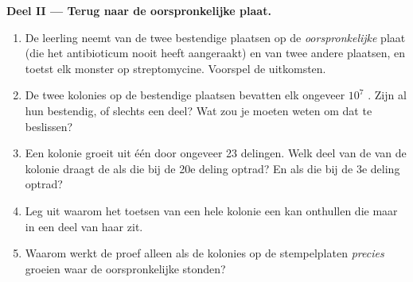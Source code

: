 \begin{problem}
\medskip
\noindent\textbf{Deel II --- Terug naar de oorspronkelijke plaat.}
\begin{enumerate}[resume]
  \item De leerling neemt  van de twee bestendige plaatsen op de
        \emph{oorspronkelijke} plaat (die het antibioticum nooit heeft
        aangeraakt) en van twee andere plaatsen, en toetst elk monster op
        streptomycine. Voorspel de uitkomsten.
  \item De twee kolonies op de bestendige plaatsen bevatten elk ongeveer
        $10^7$ . Zijn al hun  bestendig, of slechts een deel?
        Wat zou je moeten weten om dat te beslissen?
  \item Een kolonie groeit uit één  door ongeveer 23 delingen. Welk
        deel van de  van de kolonie draagt de  als die bij
        de 20e deling optrad? En als die bij de 3e deling optrad?
  \item Leg uit waarom het toetsen van een hele kolonie een  kan
        onthullen die maar in een deel van haar  zit.
  \item Waarom werkt de proef alleen als de kolonies op de stempelplaten
        \emph{precies} groeien waar de oorspronkelijke stonden?
\end{enumerate}


\end{problem}
